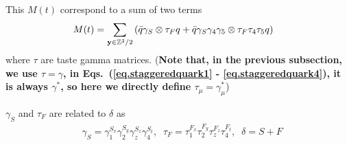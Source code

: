 This $M(t)$ correspond to a sum of two terms
\begin{equation}
\begin{split}
&M(t)=\sum _{{\bf y}\in \mathbb{Z}^3 / 2}\left(\bar{q}\gamma _S \otimes \tau _F q+\bar{q} \gamma _S \gamma _4 \gamma _5 \otimes \tau _F \tau _4\tau _5 q\right)
\end{split}
\end{equation}
where $\tau$ are taste gamma matrices. (\textbf{Note that, in the previous subsection, we use $\tau =\gamma$, in Eqs.~(\ref{eq.staggeredquark1} - \ref{eq.staggeredquark4}), it is always $\gamma ^*$, so here we directly define \textcolor[rgb]{0,0,1}{$\tau _{\mu}=\gamma _{\mu}^*$}})

$\gamma _S$ and $\tau _F$ are related to $\delta$ as
\begin{equation}
\begin{split}
&\gamma _S = \gamma _1^{S_x}\gamma _2^{S_y}\gamma _z^{S_z}\gamma _4^{S_t},\;\;\tau _F = \tau _1^{F_x}\tau _2^{F_y}\tau _z^{F_z}\tau _4^{F_t},\;\;\delta = S+F
\end{split}
\end{equation}

